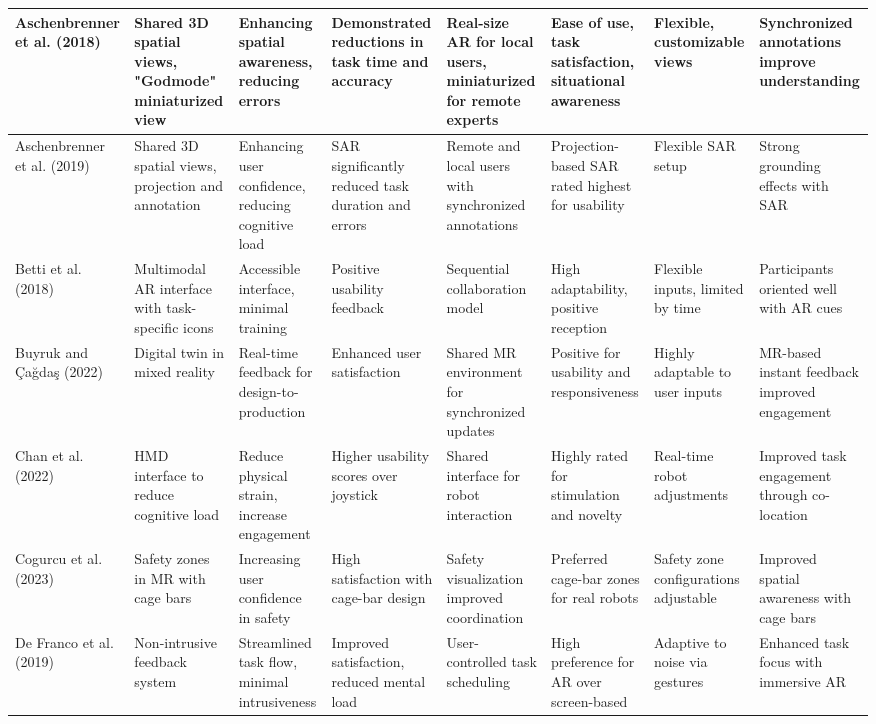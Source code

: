 {\begin{landscape}
\begin{longtable}{@{}p{1.8cm}p{1.8cm}p{1.8cm}p{1.8cm}p{1.8cm}p{1.8cm}p{1.8cm}p{1.8cm}@{}}
\bottomrule
\endlastfoot
Aschenbrenner et al. (2018) & Shared 3D spatial views, "Godmode" miniaturized view & Enhancing spatial awareness, reducing errors & Demonstrated reductions in task time and accuracy & Real-size AR for local users, miniaturized for remote experts & Ease of use, task satisfaction, situational awareness & Flexible, customizable views & Synchronized annotations improve understanding \\
\midrule
Aschenbrenner et al. (2019) & Shared 3D spatial views, projection and annotation & Enhancing user confidence, reducing cognitive load & SAR significantly reduced task duration and errors & Remote and local users with synchronized annotations & Projection-based SAR rated highest for usability & Flexible SAR setup & Strong grounding effects with SAR \\
\midrule
Betti et al. (2018) & Multimodal AR interface with task-specific icons & Accessible interface, minimal training & Positive usability feedback & Sequential collaboration model & High adaptability, positive reception & Flexible inputs, limited by time & Participants oriented well with AR cues \\
\midrule
Buyruk and Çağdaş (2022) & Digital twin in mixed reality & Real-time feedback for design-to-production & Enhanced user satisfaction & Shared MR environment for synchronized updates & Positive for usability and responsiveness & Highly adaptable to user inputs & MR-based instant feedback improved engagement \\
\midrule
Chan et al. (2022) & HMD interface to reduce cognitive load & Reduce physical strain, increase engagement & Higher usability scores over joystick & Shared interface for robot interaction & Highly rated for stimulation and novelty & Real-time robot adjustments & Improved task engagement through co-location \\
\midrule
Cogurcu et al. (2023) & Safety zones in MR with cage bars & Increasing user confidence in safety & High satisfaction with cage-bar design & Safety visualization improved coordination & Preferred cage-bar zones for real robots & Safety zone configurations adjustable & Improved spatial awareness with cage bars \\
\midrule
De Franco et al. (2019) & Non-intrusive feedback system & Streamlined task flow, minimal intrusiveness & Improved satisfaction, reduced mental load & User-controlled task scheduling & High preference for AR over screen-based & Adaptive to noise via gestures & Enhanced task focus with immersive AR \\

\end{longtable}
\end{landscape}}
